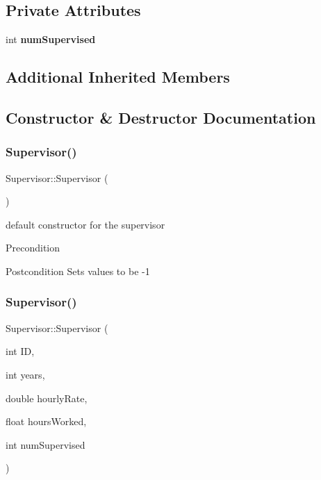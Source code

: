 \subsection*{Private Attributes}
\begin{DoxyCompactItemize}
\item 
\mbox{\label{classSupervisor_af8b7097d8147c93a68d1f63c5b898797}} 
int {\bfseries num\+Supervised}
\end{DoxyCompactItemize}
\subsection*{Additional Inherited Members}


\subsection{Constructor \& Destructor Documentation}
\mbox{\label{classSupervisor_a9d7eafc36b5429092ba0f758bc7841c4}} 
\subsubsection{\texorpdfstring{Supervisor()}{Supervisor()}\hspace{0.1cm}{\footnotesize\ttfamily [1/2]}}
{\footnotesize\ttfamily Supervisor\+::\+Supervisor (\begin{DoxyParamCaption}{ }\end{DoxyParamCaption})}

default constructor for the supervisor

\begin{DoxyPrecond}{Precondition}

\end{DoxyPrecond}
\begin{DoxyPostcond}{Postcondition}
Sets values to be -\/1 
\end{DoxyPostcond}
\mbox{\label{classSupervisor_a02d9245744652deb20e9408001d6ed3b}} 
\subsubsection{\texorpdfstring{Supervisor()}{Supervisor()}\hspace{0.1cm}{\footnotesize\ttfamily [2/2]}}
{\footnotesize\ttfamily Supervisor\+::\+Supervisor (\begin{DoxyParamCaption}\item[{int}]{ID,  }\item[{int}]{years,  }\item[{double}]{hourly\+Rate,  }\item[{float}]{hours\+Worked,  }\item[{int}]{num\+Supervised }\end{DoxyParamCaption})}

